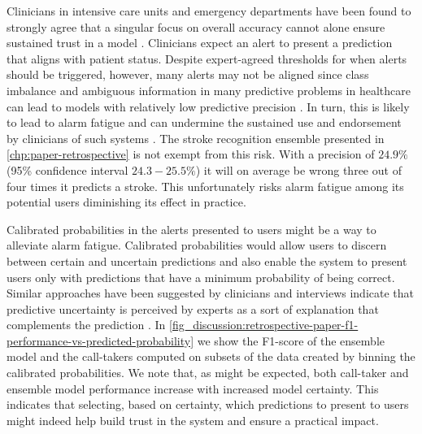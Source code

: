 Clinicians in intensive care units and emergency departments have been found to strongly agree that a singular focus on overall accuracy cannot alone ensure sustained trust in a model \cite{tonekaboni_what_2019}. Clinicians expect an alert to present a prediction that aligns with patient status. Despite expert-agreed thresholds for when alerts should be triggered, however, many alerts may not be aligned since class imbalance and ambiguous information in many predictive problems in healthcare can lead to models with relatively low predictive precision \parencite{umscheid_development_2015, cite14, cite15, wenstrup_retrospective_2023}. In turn, this is likely to lead to alarm fatigue \parencite{embi_evaluating_2012} and can undermine the sustained use and endorsement by clinicians of such systems \parencite{guidi_clinician_2015}. 
The stroke recognition ensemble presented in \cref{chp:paper-retrospective} is not exempt from this risk. With a precision of $24.9\%$ (95\% confidence interval $24.3-25.5\%$) it will on average be wrong three out of four times it predicts a stroke. This unfortunately risks alarm fatigue among its potential users diminishing its effect in practice.

Calibrated probabilities in the alerts presented to users might be a way to alleviate alarm fatigue. Calibrated probabilities would allow users to discern between certain and uncertain predictions and also enable the system to present users only with predictions that have a minimum probability of being correct. Similar approaches have been suggested by clinicians and interviews indicate that predictive uncertainty is perceived by experts as a sort of explanation that complements the prediction \cite{tonekaboni_what_2019}. In \cref{fig_discussion:retrospective-paper-f1-performance-vs-predicted-probability} we show the F1-score of the ensemble model and the call-takers computed on subsets of the data created by binning the calibrated probabilities. We note that, as might be expected, both call-taker and ensemble model performance increase with increased model certainty. This indicates that selecting, based on certainty, which predictions to present to users might indeed help build trust in the system and ensure a practical impact. 



